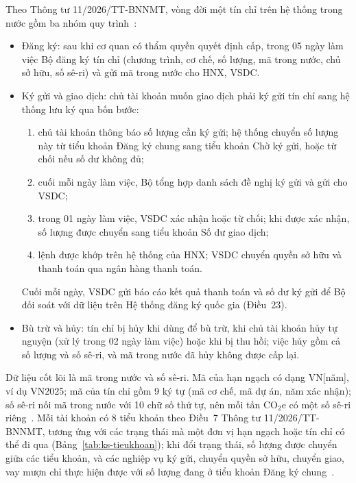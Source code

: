 Theo Thông tư 11/2026/TT-BNNMT, vòng đời một tín chỉ trên hệ thống trong nước gồm ba nhóm quy trình~\cite{vietnam2026thongtu11,vietnam2026nghidinh29}:
\begin{itemize}
    \item Đăng ký: sau khi cơ quan có thẩm quyền quyết định cấp, trong 05 ngày làm việc Bộ đăng ký tín chỉ (chương trình, cơ chế, số lượng, mã trong nước, chủ sở hữu, số sê-ri) và gửi mã trong nước cho HNX, VSDC.
    \item Ký gửi và giao dịch: chủ tài khoản muốn giao dịch phải ký gửi tín chỉ sang hệ thống lưu ký qua bốn bước:
    \begin{enumerate}
        \item chủ tài khoản thông báo số lượng cần ký gửi; hệ thống chuyển số lượng này từ tiểu khoản Đăng ký chung sang tiểu khoản Chờ ký gửi, hoặc từ chối nếu số dư không đủ;
        \item cuối mỗi ngày làm việc, Bộ tổng hợp danh sách đề nghị ký gửi và gửi cho VSDC;
        \item trong 01 ngày làm việc, VSDC xác nhận hoặc từ chối; khi được xác nhận, số lượng được chuyển sang tiểu khoản Số dư giao dịch;
        \item lệnh được khớp trên hệ thống của HNX; VSDC chuyển quyền sở hữu và thanh toán qua ngân hàng thanh toán.
    \end{enumerate}
    Cuối mỗi ngày, VSDC gửi báo cáo kết quả thanh toán và số dư ký gửi để Bộ đối soát với dữ liệu trên Hệ thống đăng ký quốc gia (Điều~23).
    \item Bù trừ và hủy: tín chỉ bị hủy khi dùng để bù trừ, khi chủ tài khoản hủy tự nguyện (xử lý trong 02 ngày làm việc) hoặc khi bị thu hồi; việc hủy gồm cả số lượng và số sê-ri, và mã trong nước đã hủy không được cấp lại.
\end{itemize}

Dữ liệu cốt lõi là mã trong nước và số sê-ri. Mã của hạn ngạch có dạng VN[năm], ví dụ VN2025; mã của tín chỉ gồm 9 ký tự (mã cơ chế, mã dự án, năm xác nhận); số sê-ri nối mã trong nước với 10 chữ số thứ tự, nên mỗi tấn CO$_2$e có một số sê-ri riêng~\cite{vietnam2026thongtu11}. Mỗi tài khoản có 8 tiểu khoản theo Điều~7 Thông tư 11/2026/TT-BNNMT, tương ứng với các trạng thái mà một đơn vị hạn ngạch hoặc tín chỉ có thể đi qua (Bảng~\ref{tab:ks-tieukhoan}); khi đổi trạng thái, số lượng được chuyển giữa các tiểu khoản, và các nghiệp vụ ký gửi, chuyển quyền sở hữu, chuyển giao, vay mượn chỉ thực hiện được với số lượng đang ở tiểu khoản Đăng ký chung~\cite{vietnam2026thongtu11}.

